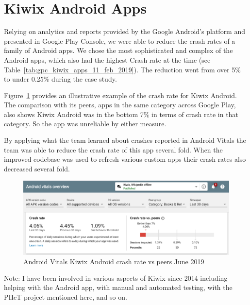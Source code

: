 

\section{Kiwix Android Apps}
\label{section-kiwix-case-study}
Relying on analytics and reports provided by the Google Android's platform and presented in Google Play Console, we were able to reduce the crash rates of a family of Android apps. 
%
We chose the most sophisticated and complex of the Android apps, which also had the highest Crash rate at the time (see Table~\ref{tab:gpc_kiwix_apps_11_feb_2019}). The reduction went from over 5\% to under 0.25\% during the case study.

Figure~\ref{fig:android-vitals-kiwix-android-crash-rate-vs-peers} provides an illustrative example of the crash rate for Kiwix Android. The comparison with its peers, apps in the same category across Google Play, also shows Kiwix Android was in the bottom 7\% in terms of crash rate in that category. So the app was unreliable by either measure.

By applying what the team learned about crashes reported in Android Vitals the team was able to reduce the crash rate of this app several fold. When the improved codebase was used to refresh various custom apps their crash rates also decreased several fold.

\begin{figure}
    \centering
    \includegraphics[width=13cm]{images/android-vitals-screenshots/Example-crash-rate-vs-peers 10-jun-2019.png}
    \caption{Android Vitals Kiwix Android crash rate vs peers  June 2019}
    \label{fig:android-vitals-kiwix-android-crash-rate-vs-peers}
\end{figure}

Note: I have been involved in various aspects of Kiwix since 2014 including helping with the Android app, with manual and automated testing, with the PHeT project mentioned here, and so on.



